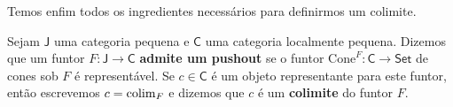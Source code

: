 Temos enfim todos os ingredientes necessários para definirmos um colimite.

\begin{defin}[Colimite]
  \label{defin:colimite}
  Sejam $\mathsf{J}$ uma categoria pequena e $\mathsf{C}$ uma categoria localmente pequena.
  Dizemos que um funtor $F: \mathsf{J} \to \mathsf{C}$ \textbf{admite um pushout} se o funtor $\mathrm{Cone}^F : \mathsf{C} \to \mathsf{Set}$ de cones sob $F$ é representável.
  Se $c \in \mathsf{C}$ é um objeto representante para este funtor, então escrevemos $c = \operatorname{colim}_F$ e dizemos que $c$ é um \textbf{colimite} do funtor $F$.
\end{defin}

\printbibliography



